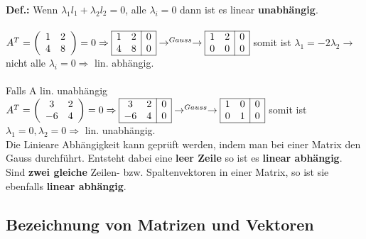 	\textbf{Def.:} Wenn $\lambda_1 l_1 + \lambda_2 l_2 = 0$, alle $\lambda_i = 0$ dann ist es linear \textbf{unabhängig}. \\ \\

	$A^T = \left(\begin{array}{cc}
		1 & 2 \\
		4 & 8
	\end{array}\right) =  0 \Rightarrow \begin{array}{|cc|c|}
		\hline1 & 2 & 0\\
		4 & 8 & 0\\
		\hline
	\end{array} \rightarrow^{Gauss} \rightarrow \begin{array}{|cc|c|}
		\hline 1 & 2 & 0\\
		0 & 0 & 0\\
		\hline
	\end{array} $ \qquad somit ist $\lambda_1 = -2\lambda_2 \rightarrow$ nicht alle $\lambda_i = 0 \Rightarrow$ lin. abhängig.\\ \\

	Falls A lin. unabhängig\\
	$ A^T = \left(\begin{array}{cc}
		3 & 2\\
		-6 & 4\\
	\end{array}\right) = 0 \Rightarrow \begin{array}{|cc|c|}
		\hline 3 & 2 & 0\\
		-6 & 4 & 0 \\
		\hline
	\end{array} \rightarrow^{Gauss} \rightarrow \begin{array}{|cc|c|}
		\hline 1 & 0 & 0\\
		0 & 1 & 0\\
		\hline
	\end{array}$  \qquad somit ist $\lambda_1 = 0, \lambda_2 = 0 \Rightarrow$ lin. unabhängig.\\

	Die Linieare Abhängigkeit kann geprüft werden, indem man bei einer Matrix den Gauss durchführt. Entsteht dabei eine \textbf{leer Zeile}
	so ist es \textbf{linear abhängig}. \\
	Sind \textbf{zwei gleiche} Zeilen- bzw. Spaltenvektoren in einer Matrix, so ist sie ebenfalls \textbf{linear abhängig}.


\subsection{Bezeichnung von Matrizen und Vektoren}
